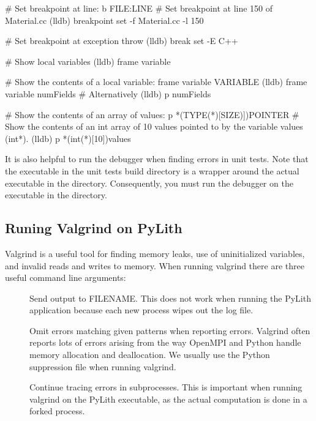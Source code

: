 \begin{shell}
# Set breakpoint at line: b FILE:LINE
# Set breakpoint at line 150 of Material.cc
(lldb) breakpoint set -f Material.cc -l 150

# Set breakpoint at exception throw
(lldb) break set -E C++

# Show local variables
(lldb) frame variable

# Show the contents of a local variable: frame variable VARIABLE
(lldb) frame variable numFields
# Alternatively
(lldb) p numFields

# Show the contents of an array of values: p *(TYPE(*)[SIZE)])POINTER
# Show the contents of an int array of 10 values pointed to by the variable values (int*).
(lldb) p *(int(*)[10])values
\end{shell}

It is also helpful to run the debugger when finding errors in unit tests. Note that the executable in the unit tests
build directory is a wrapper around the actual executable in the  directory. Consequently, you must run
the debugger on the executable in the  directory.




\subsection{Runing Valgrind on PyLith}

Valgrind is a useful tool for finding memory leaks, use of uninitialized variables, and invalid reads and writes to
memory. When running valgrind there are three useful command line arguments: \begin{description}
\item[] Send output to FILENAME. This does not work when running the PyLith
application because each new process wipes out the log file. \item[] Omit errors
matching given patterns when reporting errors. Valgrind often reports lots of errors arising from the way OpenMPI and
Python handle memory allocation and deallocation. We usually use the Python suppression file
 when running valgrind. \item[] Continue
tracing errors in subprocesses. This is important when running valgrind on the PyLith executable, as the actual
computation is done in a forked process. \end{description}

